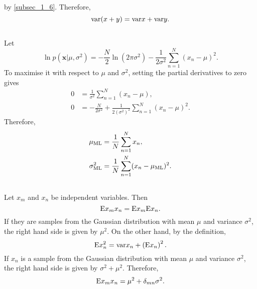 %
by \ref{subsec_1_6}. Therefore,
%
\begin{equation}
{\rm var} (x + y) = {\rm var} x + {\rm var} y.
\end{equation}
%


\subsection{}
Let
%
\begin{equation}
\ln p \left( \mathbf{x} | \mu, \sigma ^ 2 \right) = - \frac{N}{2} \ln \left( 2 \pi \sigma ^ 2 \right) - \frac{1}{2 \sigma ^ 2} \sum_{n = 1}^{N} (x_n - \mu) ^ 2.
\end{equation}
%
To maximise it with respect to $\mu$ and $\sigma ^ 2$, setting the partial derivatives to zero gives
%
\begin{equation}
\begin{aligned}
0 &= \frac{1}{\sigma ^ 2} \sum_{n = 1}^{N} (x_n - \mu), \\
0 &= - \frac{N}{2 \sigma ^ 2} + \frac{1}{2 \left( \sigma ^ 2 \right) ^ 2} \sum_{n = 1}^{N} (x_n - \mu) ^ 2.
\end{aligned}
\end{equation}
%
Therefore,
%
\begin{equation}
\begin{aligned}
\mu_{\rm ML} &= \frac{1}{N} \sum_{n = 1}^{N} x_n, \\
\sigma_{\rm ML} ^ 2 &= \frac{1}{N} \sum_{n = 1}^{N} (x_n - \mu_{\rm ML}) ^ 2.
\end{aligned}
\end{equation}
%


\subsection{}
Let $x_m$ and $x_n$ be independent variables. 
Then
%
\begin{equation}
{\rm E} x_m x_n = {\rm E} x_m {\rm E} x_n.
\end{equation}
%
If they are samples from the Gaussian distribution with mean $\mu$ and variance $\sigma ^ 2$, the right hand side is given by $\mu ^ 2$.
On the other hand, by the definition, 
%
\begin{equation}
{\rm E} x_n ^ 2 =  {\rm var} x_n + \left( {\rm E} x_n \right) ^ 2.
\end{equation}
%
If $x_n$ is a sample from the Gaussian distribution with mean $\mu$ and variance $\sigma ^ 2$, the right hand side is given by $\sigma ^ 2 + \mu ^ 2$.
Therefore,
%
\begin{equation}
{\rm E} x_m x_n = \mu ^ 2 + \delta_{mn} \sigma ^ 2.
\end{equation}
%


